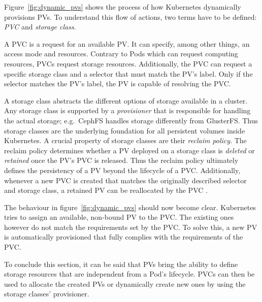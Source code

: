 Figure~\ref{fig:dynamic_pvs} shows the process of how Kubernetes dynamically
provisions \acp{PV}. To understand this flow of actions, two terms have to be
defined: \textit{\acf{PVC}} and \textit{storage class}. 

A \ac{PVC} is a request for an available \ac{PV}. It can specify, among other
things, an access mode and resources. Contrary to Pods which can request
computing resources, \acp{PVC} request storage resources. Additionally, the
\ac{PVC} can request a specific storage class and a selector that must match
the \ac{PV}'s label. Only if the selector matches the \ac{PV}'s label, the
\ac{PV} is capable of resolving the \ac{PVC}.

A storage class abstracts the different options of storage available in a
cluster. Any storage class is supported by a \textit{provisioner} that is
responsible for handling the actual storage; e.g.\ CephFS handles storage
differently from GlusterFS. Thus storage classes are the underlying foundation
for all persistent volumes inside Kubernetes. A crucial property of storage
classes are their \textit{reclaim policy}. The reclaim policy determines
whether a \ac{PV} deployed on a storage class is \textit{deleted} or
\textit{retained} once the \ac{PV}'s \ac{PVC} is released. Thus the reclaim
policy ultimately defines the persistency of a \ac{PV} beyond the lifecycle of
a \ac{PVC}. Additionally, whenever a new \ac{PVC} is created that matches the
originally described selector and storage class, a retained \ac{PV} can be
reallocated by the \ac{PVC} \autocite[Ch. 6]{LuksaKubernetesAction2017}.

The behaviour in figure~\ref{fig:dynamic_pvs} should now become clear.
Kubernetes tries to assign an available, non-bound \ac{PV} to the \ac{PVC}.
The existing ones however do not match the requirements set by the \ac{PVC}. To
solve this, a new \ac{PV} is automatically provisioned that fully complies with
the requirements of the \ac{PVC}.

To conclude this section, it can be said that \acp{PV} bring the ability to
define storage resources that are independent from a Pod's lifecycle.
\acp{PVC} can then be used to allocate the created \acp{PV} or dynamically
create new ones by using the storage classes' provisioner.

